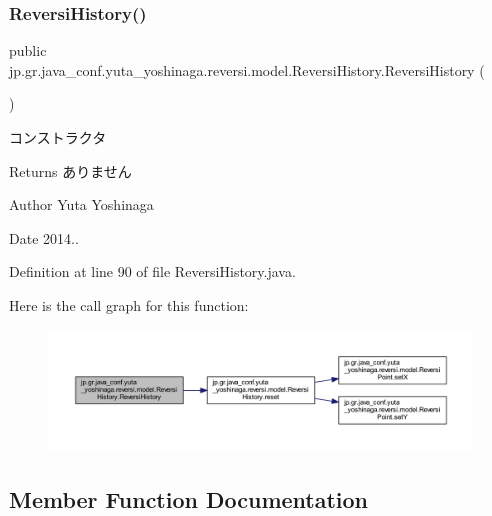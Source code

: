 \subsubsection{\texorpdfstring{Reversi\+History()}{ReversiHistory()}}
{\footnotesize\ttfamily public jp.\+gr.\+java\+\_\+conf.\+yuta\+\_\+yoshinaga.\+reversi.\+model.\+Reversi\+History.\+Reversi\+History (\begin{DoxyParamCaption}{ }\end{DoxyParamCaption})}



コンストラクタ 

\begin{DoxyReturn}{Returns}
ありません 
\end{DoxyReturn}
\begin{DoxyAuthor}{Author}
Yuta Yoshinaga 
\end{DoxyAuthor}
\begin{DoxyDate}{Date}
2014.. 
\end{DoxyDate}


Definition at line 90 of file Reversi\+History.\+java.

Here is the call graph for this function\+:
\nopagebreak
\begin{figure}[H]
\begin{center}
\leavevmode
\includegraphics[width=350pt]{classjp_1_1gr_1_1java__conf_1_1yuta__yoshinaga_1_1reversi_1_1model_1_1_reversi_history_abd0f556489e10b58555304449c6c2682_cgraph}
\end{center}
\end{figure}


\subsection{Member Function Documentation}
\mbox{\label{classjp_1_1gr_1_1java__conf_1_1yuta__yoshinaga_1_1reversi_1_1model_1_1_reversi_history_a43629f8c4c3be927d687f174978f204d}} 
